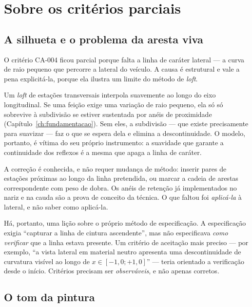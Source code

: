 \section{Sobre os crit\'erios parciais}

\subsection{A silhueta e o problema da aresta viva}

O crit\'erio CA-004 ficou parcial porque falta a linha de car\'ater lateral --- a curva de
raio pequeno que percorre a lateral do ve\'iculo. A causa \'e estrutural e vale a pena
explicit\'a-la, porque ela ilustra um limite do m\'etodo de \emph{loft}.

Um \emph{loft} de esta{\c{c}}\~oes transversais interpola suavemente ao longo do eixo
longitudinal. Se uma fei{\c{c}}\~ao exige uma varia{\c{c}}\~ao de raio pequeno, ela s\'o
s\'o sobrevive \`a subdivis\~ao se estiver sustentada por an\'eis de proximidade
(Cap\'itulo~\ref{ch:fundamentacao}). Sem eles, a subdivis\~ao --- que existe
precisamente para suavizar --- faz o que se espera dela e elimina a descontinuidade. O
modelo, portanto, \'e v\'itima do seu pr\'oprio instrumento: a suavidade que garante a
continuidade dos reflexos \'e a mesma que apaga a linha de car\'ater.

A corre{\c{c}}\~ao \'e conhecida, e n\~ao requer mudan{\c{c}}a de m\'etodo: inserir pares de
esta{\c{c}}\~oes pr\'oximas ao longo da linha pretendida, ou marcar a cadeia de arestas
correspondente com peso de dobra. Os an\'eis de reten{\c{c}}\~ao j\'a implementados no nariz e
na cauda s\~ao a prova de conceito da t\'ecnica. O que faltou foi \emph{aplic\'a-la} \`a
lateral, e n\~ao saber como aplic\'a-la.

H\'a, portanto, uma li{\c{c}}\~ao sobre o pr\'oprio m\'etodo de especifica{\c{c}}\~ao. A
especifica{\c{c}}\~ao exigia ``capturar a linha de cintura ascendente'', mas n\~ao
especificava \emph{como verificar} que a linha estava presente. Um crit\'erio de
aceita{\c{c}}\~ao mais preciso --- por exemplo, ``a vista lateral em material neutro apresenta
uma descontinuidade de curvatura vis\'ivel ao longo de $x \in [-1,0; +1,0]$'' --- teria
orientado a verifica{\c{c}}\~ao desde o in\'icio. Crit\'erios precisam ser
\emph{observ\'aveis}, e n\~ao apenas corretos.

\subsection{O tom da pintura}

